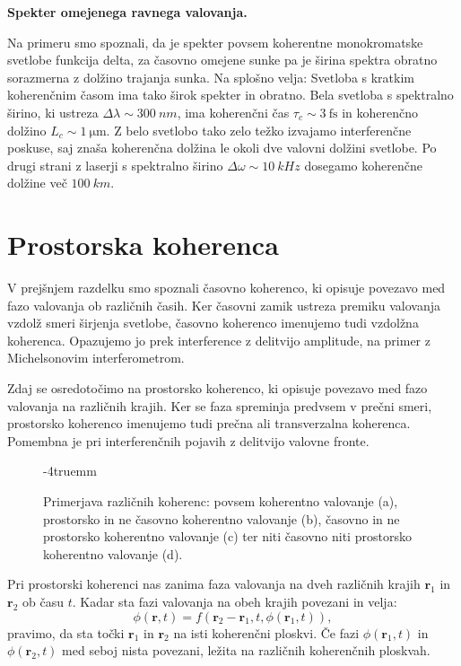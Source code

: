 \begin{example}{\bf Spekter omejenega ravnega valovanja.}
\end{example}

Na primeru smo spoznali, da je spekter povsem koherentne monokromatske svetlobe funkcija delta, 
za časovno omejene sunke pa je širina spektra obratno sorazmerna z dolžino trajanja sunka. Na splošno
velja:
Svetloba s kratkim koherenčnim časom ima tako širok spekter in obratno. Bela svetloba s spektralno
širino, ki ustreza $\Delta \lambda \sim 300~\si{nm}$, ima koherenčni čas $\tau_c \sim 3~\si{\femto\second}$
in koherenčno dolžino $L_c \sim 1~\si{\micro\meter}$. Z belo svetlobo tako zelo težko
izvajamo interferenčne poskuse, saj znaša koherenčna dolžina le okoli dve valovni dolžini svetlobe.
Po drugi strani z laserji s spektralno širino $\Delta \omega \sim 10~\si{kHz}$ 
dosegamo koherenčne dolžine več $100~\si{km}$. 

\section{Prostorska koherenca}
V prejšnjem razdelku smo spoznali časovno koherenco, ki opisuje povezavo
med fazo valovanja ob različnih časih. 
Ker časovni zamik ustreza premiku valovanja
vzdolž smeri širjenja svetlobe, časovno koherenco imenujemo tudi vzdolžna koherenca. Opazujemo
jo prek interference z delitvijo amplitude, na primer z Michelsonovim interferometrom. 

Zdaj se osredotočimo na prostorsko koherenco, ki opisuje povezavo med fazo valovanja
na različnih krajih.
Ker se faza spreminja predvsem v prečni smeri, prostorsko
koherenco imenujemo tudi prečna ali transverzalna koherenca. 
Pomembna je pri interferenčnih pojavih z delitvijo valovne fronte. 
\begin{figure}[ht]
\centering
\def\svgwidth{140truemm} 

\caption{Primerjava različnih koherenc: povsem koherentno valovanje (a), prostorsko in 
ne časovno koherentno valovanje (b), časovno in ne prostorsko koherentno valovanje (c) ter
niti časovno niti prostorsko koherentno valovanje (d).
}
\label{fig:08_kohprimer}
\vglue-4truemm
\end{figure}

Pri prostorski koherenci nas zanima faza valovanja na dveh različnih krajih $\mathbf{r}_1$ 
in $\mathbf{r}_2$ ob času $t$. Kadar sta fazi valovanja na obeh krajih povezani in velja:
\begin{equation}
\phi(\mathbf{r}, t) =  f(\mathbf{r}_2-\mathbf{r}_1, t, \phi(\mathbf{r}_1, t)),
\label{eq:08_28}
\end{equation}
pravimo, da sta točki $\mathbf{r}_1$ in $\mathbf{r}_2$ na isti koherenčni ploskvi.
Če fazi $\phi(\mathbf{r}_1, t)$ in $\phi(\mathbf{r}_2, t)$ med seboj nista povezani, ležita
na različnih koherenčnih ploskvah. 

